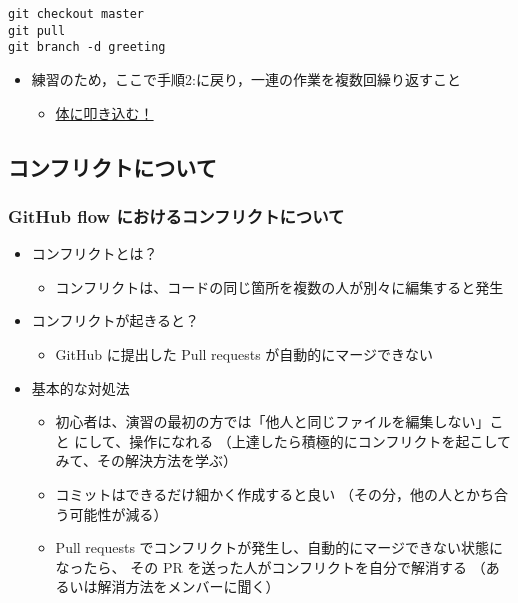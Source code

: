 \documentclass[a4paper,twoside,twocolumn]{bxjsarticle}
\begin{document}
\begin{verbatim}
git checkout master
git pull
git branch -d greeting
\end{verbatim}

\begin{itemize}
\item 練習のため，ここで手順2:に戻り，一連の作業を複数回繰り返すこと
\begin{itemize}
\item \uline{体に叩き込む！}
\end{itemize}
\end{itemize}

\subsection{コンフリクトについて}
\label{sec-2-4}
\subsubsection{GitHub flow におけるコンフリクトについて}
\label{sec-2-4-1}
\begin{itemize}
\item コンフリクトとは？
\begin{itemize}
\item コンフリクトは、コードの同じ箇所を複数の人が別々に編集すると発生
\end{itemize}
\item コンフリクトが起きると？
\begin{itemize}
\item GitHub に提出した Pull requests が自動的にマージできない
\end{itemize}
\item 基本的な対処法
\begin{itemize}
\item 初心者は、演習の最初の方では「他人と同じファイルを編集しない」こと
にして、操作になれる
（上達したら積極的にコンフリクトを起こしてみて、その解決方法を学ぶ）
\item コミットはできるだけ細かく作成すると良い
（その分，他の人とかち合う可能性が減る）
\item Pull requests でコンフリクトが発生し、自動的にマージできない状態に
なったら、 その PR を送った人がコンフリクトを自分で解消する
（あるいは解消方法をメンバーに聞く）
\end{itemize}
\end{itemize}
\end{document}
